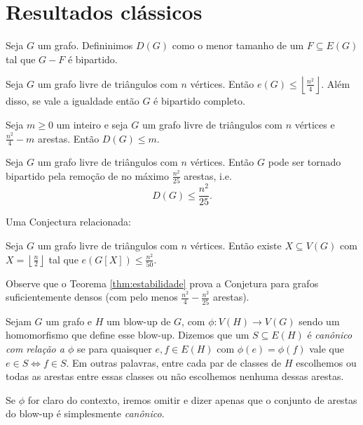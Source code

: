 \chapter{Resultados clássicos}
\label{cap:classicos}


Seja $G$ um grafo.
Defininimos $D(G)$ como o menor tamanho de um $F \subseteq E(G)$ tal que $G-F$ é bipartido.

\begin{theorem}[Mantel]
  Seja $G$ um grafo livre de triângulos com $n$ vértices.
  Então $e(G) \leq \left\lfloor\frac{n^2}{4}\right\rfloor$.
  Além disso, se vale a igualdade então $G$ é bipartido completo.
\end{theorem}

\begin{theorem}[Estabilidade] \label{thm:estabilidade}
  Seja $m \geq 0$ um inteiro e seja $G$ um grafo livre de triângulos com $n$ vértices e $\frac{n^2}{4}-m$ arestas.
  Então $D(G) \leq m$.
\end{theorem}

\begin{conjecture}  \label{conj:make-bipartite}
  Seja $G$ um grafo livre de triângulos com $n$ vértices.
  Então $G$ pode ser tornado bipartido pela remoção de no máximo $\frac{n^2}{25}$ arestas,
  i.e. \[D(G) \leq \frac{n^2}{25}.\]
\end{conjecture}

Uma Conjectura relacionada:

\begin{conjecture}  \label{conj:metadinha}
  Seja $G$ um grafo livre de triângulos com $n$ vértices.
  Então existe $X \subseteq V(G)$ com $X = \left\lfloor \frac{n}{2} \right\rfloor$ tal que $e(G[X]) \leq \frac{n^2}{50}$.
\end{conjecture}

Observe que o Teorema \ref{thm:estabilidade} prova a Conjetura para grafos suficientemente densos (com pelo menos $\frac{n^2}{4} - \frac{n^2}{25}$ arestas).

\begin{definition}
  Sejam $G$ um grafo e $H$ um blow-up de $G$, com $\phi \colon V(H) \to V(G)$ sendo um homomorfismo que define esse blow-up.
  Dizemos que um $S \subseteq E(H)$ é \emph{canônico com relação a $\phi$} se para quaisquer $e,f \in E(H)$ com
  $\phi(e)=\phi(f)$ vale que $e \in S \iff f \in S$.
  Em outras palavras, entre cada par de classes de $H$ escolhemos ou todas as arestas entre essas classes ou não escolhemos nenhuma dessas arestas.
  
  Se $\phi$ for claro do contexto, iremos omitir e dizer apenas que o conjunto de arestas do blow-up é simplesmente \emph{canônico}.
\end{definition}


